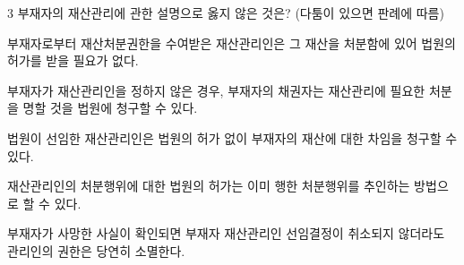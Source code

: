 \begin{question}{3}
부재자의 재산관리에 관한 설명으로 옳지 않은 것은? (다툼이 있으면 판례에 따름)
\begin{choices}
  \item 부재자로부터 재산처분권한을 수여받은 재산관리인은 그 재산을 처분함에 있어 법원의 허가를 받을 필요가 없다.
  \item 부재자가 재산관리인을 정하지 않은 경우, 부재자의 채권자는 재산관리에 필요한 처분을 명할 것을 법원에 청구할 수 있다.
  \item 법원이 선임한 재산관리인은 법원의 허가 없이 부재자의 재산에 대한 차임을 청구할 수 있다.
  \item 재산관리인의 처분행위에 대한 법원의 허가는 이미 행한 처분행위를 추인하는 방법으로 할 수 있다.
  \item 부재자가 사망한 사실이 확인되면 부재자 재산관리인 선임결정이 취소되지 않더라도 관리인의 권한은 당연히 소멸한다.
\end{choices}
\end{question}
